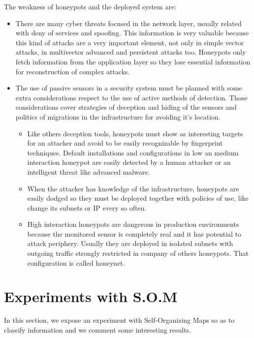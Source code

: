 \documentclass[a4paper]{llncs}
\begin{document}
The weakness of honeypots and the deployed system are:
\begin{itemize}
	\item There are many cyber threats focused in the network layer, usually related with deny of services and spoofing. This information is very valuable because this kind of attacks are a very important element, not only in simple vector attacks, in multivector advanced and persistent attacks too. Honeypots only fetch information from the application layer so they lose essential information for reconstruction of complex attacks.
	\item The use of passive sensors in a security system must be planned with some extra considerations respect to the use of active methods of detection. Those considerations cover strategies of deception and hiding of the sensors and politics of migrations in the infrastructure for avoiding it's location.
	\begin{itemize}
		\item Like others deception tools, honeypots must show as interesting targets for an attacker and avoid to be easily recognizable by fingerprint techniques. Default installations and configurations in low an medium interaction honeypot are easily detected by a human attacker or an intelligent threat like advanced malware.
		\item When the attacker has knowledge of the infrastructure, honeypots are easily dodged so they must be deployed together with policies of use, like change its subnets or IP every so often.
		\item High interaction honeypots are dangerous in production environments because the monitored sensor is completely real and it has potential to attack periphery. Usually they are deployed in isolated subnets with outgoing traffic strongly restricted in company of others honeypots. That configuration is called honeynet.
	\end{itemize}
\end{itemize}

\section{Experiments with S.O.M}
\label{sec:Improve}
In this section, we expose an experiment with Self-Organizing Maps so as to classify information and we comment some interesting results.
\end{document}
